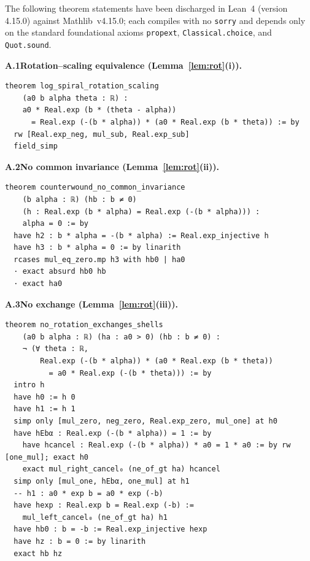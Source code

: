 
\noindent The following theorem statements have been discharged in Lean~4
(version 4.15.0) against Mathlib~v4.15.0; each compiles with no
\texttt{sorry} and depends only on the standard foundational axioms
\texttt{propext}, \texttt{Classical.choice}, and \texttt{Quot.sound}.


\medskip \noindent\textbf{A.1\quad Rotation--scaling equivalence (Lemma~\ref{lem:rot}(i)).}
\begin{verbatim}
theorem log_spiral_rotation_scaling
    (a0 b alpha theta : ℝ) :
    a0 * Real.exp (b * (theta - alpha))
      = Real.exp (-(b * alpha)) * (a0 * Real.exp (b * theta)) := by
  rw [Real.exp_neg, mul_sub, Real.exp_sub]
  field_simp
\end{verbatim}

\medskip \noindent\textbf{A.2\quad No common invariance (Lemma~\ref{lem:rot}(ii)).}
\begin{verbatim}
theorem counterwound_no_common_invariance
    (b alpha : ℝ) (hb : b ≠ 0)
    (h : Real.exp (b * alpha) = Real.exp (-(b * alpha))) :
    alpha = 0 := by
  have h2 : b * alpha = -(b * alpha) := Real.exp_injective h
  have h3 : b * alpha = 0 := by linarith
  rcases mul_eq_zero.mp h3 with hb0 | ha0
  · exact absurd hb0 hb
  · exact ha0
\end{verbatim}

\medskip \noindent\textbf{A.3\quad No exchange (Lemma~\ref{lem:rot}(iii)).}
\begin{verbatim}
theorem no_rotation_exchanges_shells
    (a0 b alpha : ℝ) (ha : a0 > 0) (hb : b ≠ 0) :
    ¬ (∀ theta : ℝ,
        Real.exp (-(b * alpha)) * (a0 * Real.exp (b * theta))
          = a0 * Real.exp (-(b * theta))) := by
  intro h
  have h0 := h 0
  have h1 := h 1
  simp only [mul_zero, neg_zero, Real.exp_zero, mul_one] at h0
  have hEbα : Real.exp (-(b * alpha)) = 1 := by
    have hcancel : Real.exp (-(b * alpha)) * a0 = 1 * a0 := by rw [one_mul]; exact h0
    exact mul_right_cancel₀ (ne_of_gt ha) hcancel
  simp only [mul_one, hEbα, one_mul] at h1
  -- h1 : a0 * exp b = a0 * exp (-b)
  have hexp : Real.exp b = Real.exp (-b) :=
    mul_left_cancel₀ (ne_of_gt ha) h1
  have hb0 : b = -b := Real.exp_injective hexp
  have hz : b = 0 := by linarith
  exact hb hz
\end{verbatim}

